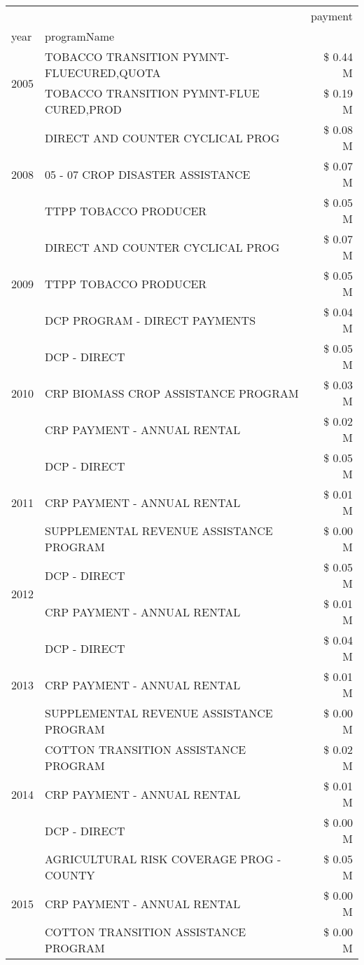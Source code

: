\begin{tabular}{llr}
\toprule
 &  & payment \\
year & programName &  \\
\midrule
\multirow[t]{2}{*}{2005} & TOBACCO TRANSITION PYMNT-FLUECURED,QUOTA & \$ 0.44 M \\
 & TOBACCO TRANSITION PYMNT-FLUE CURED,PROD & \$ 0.19 M \\
\cline{1-3}
\multirow[t]{3}{*}{2008} & DIRECT AND COUNTER CYCLICAL PROG & \$ 0.08 M \\
 & 05 - 07 CROP DISASTER ASSISTANCE & \$ 0.07 M \\
 & TTPP TOBACCO PRODUCER & \$ 0.05 M \\
\cline{1-3}
\multirow[t]{3}{*}{2009} & DIRECT AND COUNTER CYCLICAL PROG & \$ 0.07 M \\
 & TTPP TOBACCO PRODUCER & \$ 0.05 M \\
 & DCP PROGRAM - DIRECT PAYMENTS & \$ 0.04 M \\
\cline{1-3}
\multirow[t]{3}{*}{2010} & DCP - DIRECT & \$ 0.05 M \\
 & CRP BIOMASS CROP ASSISTANCE PROGRAM & \$ 0.03 M \\
 & CRP PAYMENT - ANNUAL RENTAL & \$ 0.02 M \\
\cline{1-3}
\multirow[t]{3}{*}{2011} & DCP - DIRECT & \$ 0.05 M \\
 & CRP PAYMENT - ANNUAL RENTAL & \$ 0.01 M \\
 & SUPPLEMENTAL REVENUE ASSISTANCE PROGRAM & \$ 0.00 M \\
\cline{1-3}
\multirow[t]{2}{*}{2012} & DCP - DIRECT & \$ 0.05 M \\
 & CRP PAYMENT - ANNUAL RENTAL & \$ 0.01 M \\
\cline{1-3}
\multirow[t]{3}{*}{2013} & DCP - DIRECT & \$ 0.04 M \\
 & CRP PAYMENT - ANNUAL RENTAL & \$ 0.01 M \\
 & SUPPLEMENTAL REVENUE ASSISTANCE PROGRAM & \$ 0.00 M \\
\cline{1-3}
\multirow[t]{3}{*}{2014} & COTTON TRANSITION ASSISTANCE PROGRAM & \$ 0.02 M \\
 & CRP PAYMENT - ANNUAL RENTAL & \$ 0.01 M \\
 & DCP - DIRECT & \$ 0.00 M \\
\cline{1-3}
\multirow[t]{3}{*}{2015} & AGRICULTURAL RISK COVERAGE PROG - COUNTY & \$ 0.05 M \\
 & CRP PAYMENT - ANNUAL RENTAL & \$ 0.00 M \\
 & COTTON TRANSITION ASSISTANCE PROGRAM & \$ 0.00 M \\

\end{tabular}
